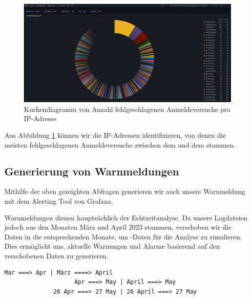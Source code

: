 \newpage
{}
\thispagestyle{lscape}
\begin{landscape}
    \begin{figure}[H]
        \centerline{\includegraphics[width=1.6\textwidth]{assets/Failed_pro_ip.png}}
        \caption[Kuchendiagramm von Anzahl fehlgeschlagenen Anmeldeversuche pro IP-Adresse]
        {Kuchendiagramm von Anzahl fehlgeschlagenen Anmeldeversuche pro IP-Adresse}
        \label{fig:1_Anmeldung_IPAdresse}
        \centering
    \end{figure}

Aus Abbildung \ref{fig:1_Anmeldung_IPAdresse} können wir die IP-Adressen identifizieren, von denen die meisten fehlgeschlagenen Anmeldeversuche zwischen dem  und dem  stammen.
\end{landscape}
\restoregeometry

\subsection{Generierung von Warnmeldungen}

Mithilfe der oben gezeighten Abfragen generieren wir auch unsere Warnmeldung mit dem Alerting Tool von Grafana.

Warnmeldungen dienen hauptsächlich der Echtzeitanalyse. Da unsere Logdateien jedoch aus den Monaten März und April 2023 stammen, verschoben wir die Daten in die entsprechenden Monate, um -Daten für die Analyse zu simulieren. Dies ermöglicht uns, aktuelle Warnungen und Alarme basierend auf den verschobenen Daten zu generieren.

\begin{center}
{
\begin{Verbatim}[frame=single]
                    Mar ===> Apr | März ====> April
                    Apr ===> May | April ===> May
              26 Apr ===> 27 May | 26 April ===> 27 May
\end{Verbatim}
}
\end{center}

